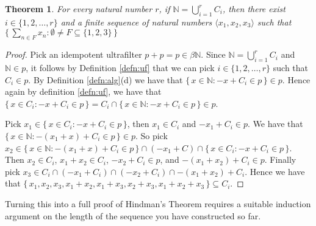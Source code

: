 \documentclass[12pt]{article}
\theoremstyle{plain}
\newtheorem{thm}{Theorem}[section]
\theoremstyle{definition}
\newcommand{\bbN}{\mathbb{N}}
\newcommand{\la}{\langle}
\newcommand{\ra}{\rangle}
\begin{document}
  \begin{thm}
    For every natural number $r$, if  \/ $\bbN = \bigcup_{i=1}^r C_i$,
    then there exist $i \in \{1, 2, \ldots, r\}$ and a finite sequence
    of natural numbers $\la x_1, x_2, x_3 \ra$ such that $\bigl\{\,
    \sum_{n\in F} x_n : \emptyset \ne F \subseteq \{1,2,3\} \,\bigr\}$
  \end{thm}
  \begin{proof}
    Pick an idempotent ultrafilter $p + p = p \in \beta\bbN$. 
    Since $\bbN = \bigcup_{i=1}^r C_i$ and $\bbN \in p$, it follows by
    Definition \ref{defn:uf} that we can pick $i \in \{1, 2, \ldots,
    r\}$ such that $C_i \in p$. 
    By Definition \ref{defn:alg}(d) we have that $\{\, x \in \bbN : -x
    + C_i \in p \,\} \in p$.
    Hence again by definition \ref{defn:uf}, we have that $\{\, x \in
    C_i : -x + C_i \in p \,\} = C_i \cap
    \{\, x \in \bbN : -x + C_i \in p \,\} \in p$.

    Pick $x_1 \in \{\,x \in C_i: -x + C_i \in p \,\}$, then
    $x_1 \in C_i$ and $-x_1 + C_i \in p$. 
    We have that $\{\,x \in \bbN : -(x_1+x)+C_i \in p \,\} \in p$.
    So pick $x_2 \in \{\, x \in \bbN : -(x_1+x)+C_i \in p \,\} \cap
    (-x_1+C) \cap \{\, x \in C_i : -x+C_i \in p \,\}$.
    Then $x_2 \in C_i$, $x_1+x_2 \in C_i$, $-x_2 + C_i \in p$, and
    $-(x_1 + x_2) + C_i \in p$.
    Finally pick $x_3 \in C_i \cap (-x_1+C_i) \cap (-x_2+C_i) \cap
    -(x_1+x_2) + C_i$. 
    Hence we have that $\{\, x_1, x_2, x_3, x_1+x_2, x_1+x_3, x_2+x_3,
    x_1+x_2+x_3 \,\} \subseteq C_i$.
  \end{proof}
Turning this into a full proof of Hindman's Theorem requires a
suitable induction argument on the length of the sequence you have
constructed so far. 
\end{document}

